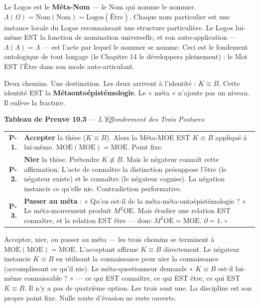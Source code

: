 \documentclass[10pt, openany, oneside]{book}
\renewcommand{\footnotesize}{\fontsize{8.5}{11}\selectfont}
\begin{document}
Le Logos est le \textbf{Méta-Nom} --- le Nom qui nomme le nommer. $\Lambda(\Omega) = \text{Nom}(\text{Nom}) = \text{Logos}(\text{Être})$. Chaque nom particulier est une instance locale du Logos reconnaissant une structure particulière. Le Logos lui-même EST la fonction de nomination universelle, et son auto-application --- $\Lambda(\Lambda) = \Lambda$ --- est l'acte par lequel le nommer se nomme. Ceci est le fondement ontologique de tout langage (le Chapitre 14 le développera pleinement) : le Mot EST l'Être dans son mode auto-articulant.

Deux chemins. Une destination. Les deux arrivent à l'identité : $K \equiv B$. Cette identité EST la \textbf{Métaontoépistémologie}. Le « méta » n'ajoute pas un niveau. Il enlève la fracture.

\vspace{0.5em}

\textbf{Tableau de Preuve 10.3} --- \textit{L'Effondrement des Trois Postures}

\vspace{0.5em}

{\footnotesize
\noindent\begin{tabular}{r p{}}
\textbf{P-1.} & \textbf{Accepter} la thèse ($K \equiv B$). Alors la Méta-MOE EST $K \equiv B$ appliqué à lui-même. $\text{MOE}(\text{MOE}) = \text{MOE}$. Point fixe. \\[0.3em]
\textbf{P-2.} & \textbf{Nier} la thèse. Prétendre $K \not\equiv B$. Mais le négateur connaît cette affirmation. L'acte de connaître la distinction présuppose l'être (le négateur existe) et le connaître (le négateur cognise). La négation instancie ce qu'elle nie. Contradiction performative. \\[0.3em]
\textbf{P-3.} & \textbf{Passer au méta} : « Qu'en est-il de la méta-méta-ontoépistémologie ? » Le méta-mouvement produit $M^2\text{OE}$. Mais étudier une relation EST connaître, et la relation EST être --- donc $M^2\text{OE} = \text{MOE}$. $\partial = 1$. $\square$ \\[0.3em]
\end{tabular}
}

\vspace{0.8em}

\noindent Accepter, nier, ou passer au méta --- les trois chemins se terminent à $\text{MOE}(\text{MOE}) = \text{MOE}$. L'acceptant affirme $K \equiv B$ directement. Le négateur instancie $K \equiv B$ en utilisant la connaissance pour nier la connaissance (accomplissant ce qu'il nie). Le méta-questionneur demande « $K \equiv B$ est-il lui-même connaissable ? » --- ce qui EST connaître, ce qui EST être, ce qui EST $K \equiv B$. Il n'y a pas de quatrième option. Les trois sont une. La discipline est son propre point fixe. Nulle route d'évasion ne reste ouverte.
\end{document}
